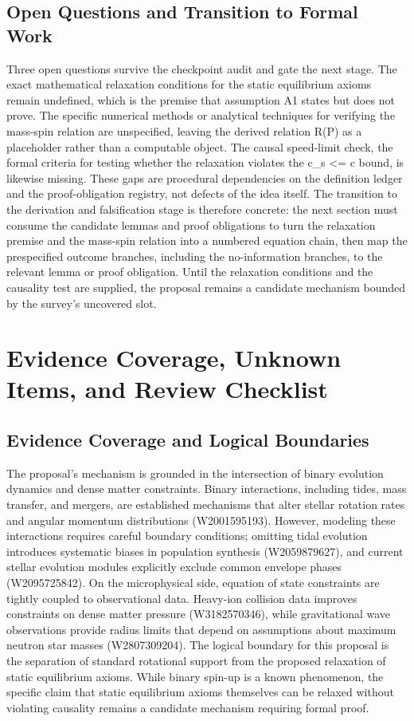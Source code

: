 \documentclass[conference]{IEEEtran}
\begin{document}
\subsection{Open Questions and Transition to Formal Work}
Three open questions survive the checkpoint audit and gate the next stage. The exact mathematical relaxation conditions for the static equilibrium axioms remain undefined, which is the premise that assumption A1 states but does not prove. The specific numerical methods or analytical techniques for verifying the mass-spin relation are unspecified, leaving the derived relation R(P) as a placeholder rather than a computable object. The causal speed-limit check, the formal criteria for testing whether the relaxation violates the c\_s <= c bound, is likewise missing. These gaps are procedural dependencies on the definition ledger and the proof-obligation registry, not defects of the idea itself. The transition to the derivation and falsification stage is therefore concrete: the next section must consume the candidate lemmas and proof obligations to turn the relaxation premise and the mass-spin relation into a numbered equation chain, then map the prespecified outcome branches, including the no-information branches, to the relevant lemma or proof obligation. Until the relaxation conditions and the causality test are supplied, the proposal remains a candidate mechanism bounded by the survey's uncovered slot.

\section{Evidence Coverage, Unknown Items, and Review Checklist}
\subsection{Evidence Coverage and Logical Boundaries}
The proposal's mechanism is grounded in the intersection of binary evolution dynamics and dense matter constraints. Binary interactions, including tides, mass transfer, and mergers, are established mechanisms that alter stellar rotation rates and angular momentum distributions (W2001595193). However, modeling these interactions requires careful boundary conditions; omitting tidal evolution introduces systematic biases in population synthesis (W2059879627), and current stellar evolution modules explicitly exclude common envelope phases (W2095725842). On the microphysical side, equation of state constraints are tightly coupled to observational data. Heavy-ion collision data improves constraints on dense matter pressure (W3182570346), while gravitational wave observations provide radius limits that depend on assumptions about maximum neutron star masses (W2807309204). The logical boundary for this proposal is the separation of standard rotational support from the proposed relaxation of static equilibrium axioms. While binary spin-up is a known phenomenon, the specific claim that static equilibrium axioms themselves can be relaxed without violating causality remains a candidate mechanism requiring formal proof.~\cite{cite_1e5d552669fc0c56,cite_3d2e6757608d5364,cite_c369df652181e8f7}
\end{document}
